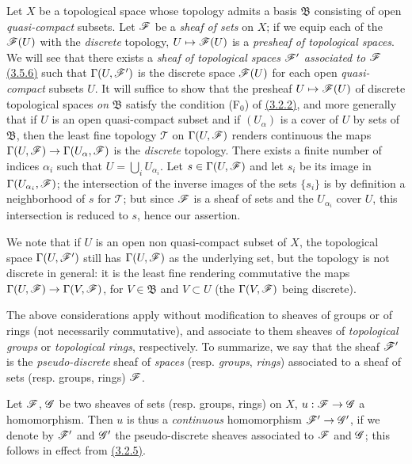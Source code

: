 \begin{env}[3.8.1]
\label{env-0.3.8.1}
Let $X$ be a topological space whose topology admits a basis $\mathfrak{B}$
consisting of open {\em quasi-compact} subsets. Let $\mathscr{F}$ be a {\em sheaf
of sets} on $X$; if we equip each of the $\mathscr{F}(U)$ with the {\em discrete}
topology, $U\mapsto\mathscr{F}(U)$ is a {\em presheaf of topological spaces}. We
will see that there exists a {\em sheaf of topological spaces $\mathscr{F}'$
associated to $\mathscr{F}$} \hyperref[env-0.3.5.6]{(3.5.6)} such that $\Gamma(U,\mathscr{F}')$ is the
discrete space $\mathscr{F}(U)$ for each open {\em quasi-compact} subsets $U$. It
will suffice to show that the presheaf $U\mapsto\mathscr{F}(U)$ of discrete
topological spaces {\em on} $\mathfrak{B}$ satisfy the condition (F$_0$) of
\hyperref[env-0.3.2.2]{(3.2.2)}, and more generally that if $U$ is an open quasi-compact
subset and if $(U_\alpha)$ is a cover of $U$ by sets of $\mathfrak{B}$, then the
least fine topology $\mathcal{T}$ on $\Gamma(U,\mathscr{F})$ renders continuous the
maps $\Gamma(U,\mathscr{F})\to\Gamma(U_\alpha,\mathscr{F})$ is the {\em discrete}
topology. There exists a finite number of indices $\alpha_i$ such that
$U=\bigcup_i U_{\alpha_i}$. Let $s\in\Gamma(U,\mathscr{F})$ and let $s_i$ be its
image in $\Gamma(U_{\alpha_i},\mathscr{F})$; the intersection of the inverse images
of the sets $\{s_i\}$ is by definition a neighborhood of $s$ for $\mathcal{T}$;
but since $\mathscr{F}$ is a sheaf of sets and the $U_{\alpha_i}$ cover $U$, this
intersection is reduced to $s$, hence our assertion.

We note that if $U$ is an open non quasi-compact subset of $X$, the topological
space $\Gamma(U,\mathscr{F}')$ still has $\Gamma(U,\mathscr{F})$ as the underlying set,
but the topology is not discrete in general: it is the least fine rendering
commutative the maps $\Gamma(U,\mathscr{F})\to\Gamma(V,\mathscr{F})$, for
$V\in\mathfrak{B}$ and $V\subset U$ (the $\Gamma(V,\mathscr{F})$ being discrete).

The above considerations apply without modification to sheaves of groups or of
rings (not necessarily commutative), and associate to them sheaves of
{\em topological groups} or {\em topological rings}, respectively. To
summarize, we say that the sheaf $\mathscr{F}'$ is the {\em pseudo-discrete} sheaf
of {\em spaces} (resp. {\em groups}, {\em rings}) associated to a sheaf of
sets (resp. groups, rings) $\mathscr{F}$.
\end{env}

\begin{env}[3.8.2]
\label{env-0.3.8.2}
Let $\mathscr{F}$, $\mathscr{G}$ be two sheaves of sets (resp. groups, rings) on $X$,
$u:\mathscr{F}\to\mathscr{G}$ a homomorphism. Then $u$ is thus a {\em continuous}
homomorphism $\mathscr{F}'\to\mathscr{G}'$, if we denote by $\mathscr{F}'$ and $\mathscr{G}'$ the
pseudo-discrete sheaves associated to $\mathscr{F}$ and $\mathscr{G}$; this follows in
effect from \hyperref[env-0.3.2.5]{(3.2.5)}.
\end{env}

